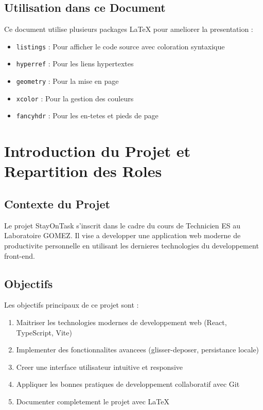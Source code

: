 \documentclass[12pt,a4paper]{article}
\begin{document}
\subsection{Utilisation dans ce Document}

Ce document utilise plusieurs packages LaTeX pour ameliorer la presentation :
\begin{itemize}
    \item \texttt{listings} : Pour afficher le code source avec coloration syntaxique
    \item \texttt{hyperref} : Pour les liens hypertextes
    \item \texttt{geometry} : Pour la mise en page
    \item \texttt{xcolor} : Pour la gestion des couleurs
    \item \texttt{fancyhdr} : Pour les en-tetes et pieds de page
\end{itemize}

\section{Introduction du Projet et Repartition des Roles}

\subsection{Contexte du Projet}

Le projet StayOnTask s'inscrit dans le cadre du cours de Technicien ES au Laboratoire GOMEZ. Il vise a developper une application web moderne de productivite personnelle en utilisant les dernieres technologies du developpement front-end.

\subsection{Objectifs}

Les objectifs principaux de ce projet sont :
\begin{enumerate}
    \item Maitriser les technologies modernes de developpement web (React, TypeScript, Vite)
    \item Implementer des fonctionnalites avancees (glisser-deposer, persistance locale)
    \item Creer une interface utilisateur intuitive et responsive
    \item Appliquer les bonnes pratiques de developpement collaboratif avec Git
    \item Documenter completement le projet avec LaTeX
\end{enumerate}
\end{document}
